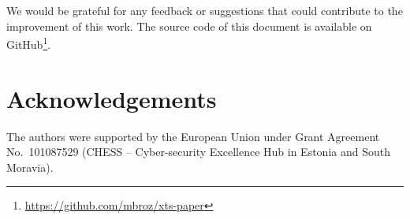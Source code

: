 \documentclass[a4paper]{article}
\begin{document}
We would be grateful for any feedback or suggestions that could contribute to the improvement of this work. The source code of this document is available on GitHub\footnote{\url{https://github.com/mbroz/xts-paper}}.

\section*{Acknowledgements}
The authors were supported by the European Union under Grant Agreement No.~101087529 (CHESS -- Cyber-security Excellence Hub in Estonia and South Moravia).

\clearpage



\end{document}
